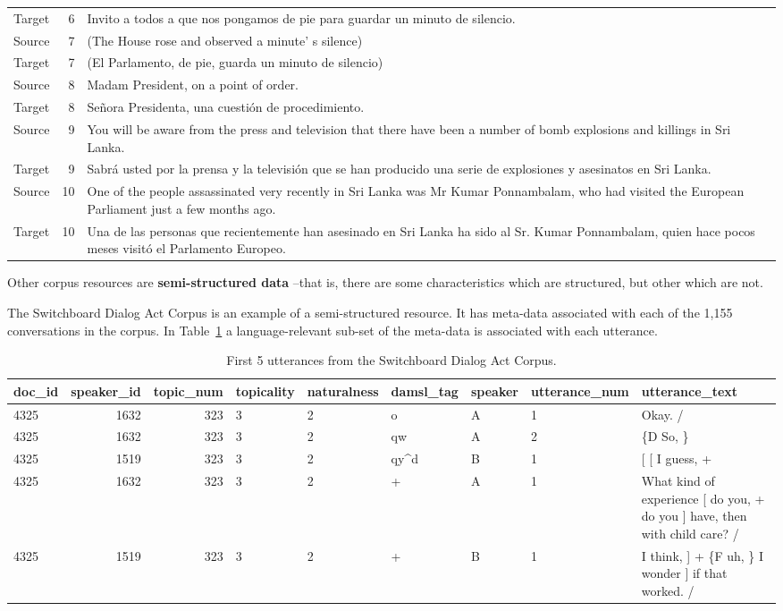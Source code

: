 \documentclass[
  letterpaper,
]{latex/krantz}
\begin{document}
\begin{table}
\begin{tabular}{lrl}
Target & 6 & Invito a todos a que nos pongamos de pie para guardar un minuto de silencio.\\
Source & 7 & (The House rose and observed a minute' s silence)\\
Target & 7 & (El Parlamento, de pie, guarda un minuto de silencio)\\
Source & 8 & Madam President, on a point of order.\\
\addlinespace
Target & 8 & Señora Presidenta, una cuestión de procedimiento.\\
Source & 9 & You will be aware from the press and television that there have been a number of bomb explosions and killings in Sri Lanka.\\
Target & 9 & Sabrá usted por la prensa y la televisión que se han producido una serie de explosiones y asesinatos en Sri Lanka.\\
Source & 10 & One of the people assassinated very recently in Sri Lanka was Mr Kumar Ponnambalam, who had visited the European Parliament just a few months ago.\\
Target & 10 & Una de las personas que recientemente han asesinado en Sri Lanka ha sido al Sr. Kumar Ponnambalam, quien hace pocos meses visitó el Parlamento Europeo.\\
\bottomrule
\end{tabular}
\end{table}

Other corpus resources are \textbf{semi-structured data} --that is,
there are some characteristics which are structured, but other which are
not.

The Switchboard Dialog Act Corpus is an example of a semi-structured
resource. It has meta-data associated with each of the 1,155
conversations in the corpus. In Table~\ref{tbl-structure-swda} a
language-relevant sub-set of the meta-data is associated with each
utterance.

\hypertarget{tbl-structure-swda}{}
\begin{table}
\caption{\label{tbl-structure-swda}First 5 utterances from the Switchboard Dialog Act Corpus. }\tabularnewline

\centering
\begin{tabular}{lrrllllll}
\toprule
doc\_id & speaker\_id & topic\_num & topicality & naturalness & damsl\_tag & speaker & utterance\_num & utterance\_text\\
\midrule
4325 & 1632 & 323 & 3 & 2 & o & A & 1 & Okay.  /\\
4325 & 1632 & 323 & 3 & 2 & qw & A & 2 & \{D So, \}\\
4325 & 1519 & 323 & 3 & 2 & qy\textasciicircum{}d & B & 1 & {}[ [ I guess, +\\
4325 & 1632 & 323 & 3 & 2 & + & A & 1 & What kind of experience [ do you, + do you ] have, then with child care? /\\
4325 & 1519 & 323 & 3 & 2 & + & B & 1 & I think, ] + \{F uh, \} I wonder ] if that worked. /\\
\bottomrule
\end{tabular}
\end{table}
\end{document}
